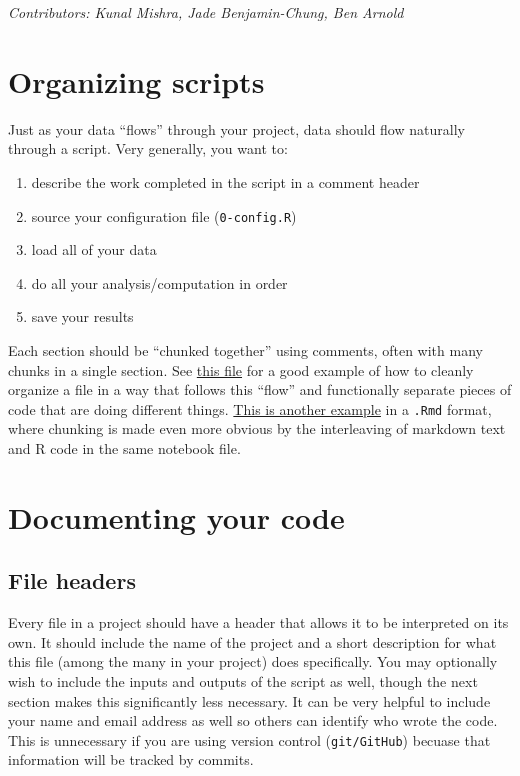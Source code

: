 \documentclass[
]{book}
\providecommand{\tightlist}{%
  \setlength{\itemsep}{0pt}\setlength{\parskip}{0pt}}
\begin{document}
\emph{Contributors: Kunal Mishra, Jade Benjamin-Chung, Ben Arnold}

\hypertarget{organizing-scripts}{%
\section{Organizing scripts}\label{organizing-scripts}}

Just as your data ``flows'' through your project, data should flow naturally through a script. Very generally, you want to:

\begin{enumerate}
\def\labelenumi{\arabic{enumi}.}
\tightlist
\item
  describe the work completed in the script in a comment header
\item
  source your configuration file (\texttt{0-config.R})
\item
  load all of your data
\item
  do all your analysis/computation in order
\item
  save your results
\end{enumerate}

Each section should be ``chunked together'' using comments, often with many chunks in a single section. See \href{https://github.com/kmishra9/Flu-Absenteeism/blob/master/Master's\%20Thesis\%20-\%20Spatial\%20Epidemiology\%20of\%20Influenza/2a\%20-\%20Statistical-Inputs.R}{this file} for a good example of how to cleanly organize a file in a way that follows this ``flow'' and functionally separate pieces of code that are doing different things. \href{https://github.com/ben-arnold/enterics-seroepi/blob/master/R/Fig1-haiti-ab-distributions.Rmd}{This is another example} in a \texttt{.Rmd} format, where chunking is made even more obvious by the interleaving of markdown text and R code in the same notebook file.

\hypertarget{documenting-your-code}{%
\section{Documenting your code}\label{documenting-your-code}}

\hypertarget{file-headers}{%
\subsection{File headers}\label{file-headers}}

Every file in a project should have a header that allows it to be interpreted on its own. It should include the name of the project and a short description for what this file (among the many in your project) does specifically. You may optionally wish to include the inputs and outputs of the script as well, though the next section makes this significantly less necessary. It can be very helpful to include your name and email address as well so others can identify who wrote the code. This is unnecessary if you are using version control (\texttt{git/GitHub}) becuase that information will be tracked by commits.
\end{document}

